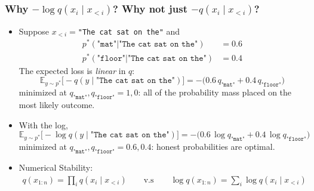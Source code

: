     \begin{frame}[shrink=10]
        \frametitle{Why $-\log q(x_i \mid x_{<i})$? Why not just $-q(x_i \mid x_{<i})$?}
        \begin{itemize}
            \item Suppose $x_{<i} = $\texttt{"The cat sat on the"} and
            \begin{align*}
            p^*(\texttt{"mat"} | \texttt{"The cat sat on the"}) &= 0.6 \\
            p^*(\texttt{"floor"} | \texttt{"The cat sat on the"}) &= 0.4
            \end{align*}
            \pause
            The expected loss is \emph{linear} in $q$:
            $$
            \mathbb{E}_{y \sim p^*}\big[ -q(y \mid \texttt{"The cat sat on the"}) \big]
            = -\big(0.6\, q_{\texttt{"mat"}} + 0.4\, q_{\texttt{"floor"}}\big)
            $$
            minimized at $q_{\texttt{"mat"}}, q_{\texttt{"floor"}} = 1,0$: all of the probability
            mass placed on the most likely outcome.
            \pause
            \item With the log,
            $$
            \mathbb{E}_{y \sim p^*}\big[ - \log q(y \mid \texttt{"The cat sat on the"}) \big]
            = -\big(0.6\, \log q_{\texttt{"mat"}} + 0.4\, \log q_{\texttt{"floor"}}\big)
            $$
            minimized at $q_{\texttt{"mat"}}, q_{\texttt{"floor"}} = 0.6,0.4$: honest probabilities are
            optimal. 
            \pause
            \item Numerical Stability:
            \begin{align*}
            q(x_{1:n}) = \prod_i q(x_i \mid x_{<i}) \qquad \text{v.s} \qquad
            \log q(x_{1:n}) = \sum_i \log q(x_i \mid x_{<i})
            \end{align*}
        \end{itemize}
        \end{frame}
        
